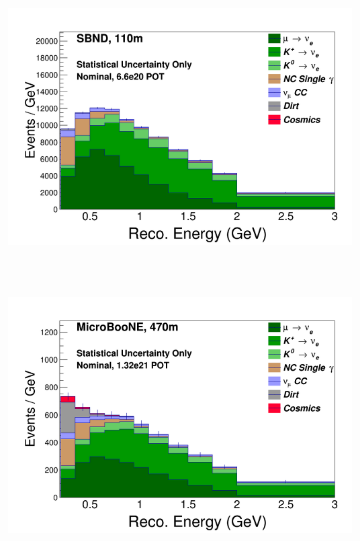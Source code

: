 \begin{figure}[htbp]
    \centering
    \begin{subfigure}[]{0.49\textwidth}
        \centering
        \includegraphics[width=\textwidth]{sbn_figures/nominal_nue_appearance_nosig_SBND_110m}
    \end{subfigure}
    ~
    \begin{subfigure}[]{0.49\textwidth}
        \centering
        \includegraphics[width=\textwidth]{sbn_figures/nominal_nue_appearance_nosig_MicroBooNE_470m}
    \end{subfigure}
    \\
    \begin{subfigure}[]{0.49\textwidth}
        \centering

\end{subfigure}
\end{figure}
